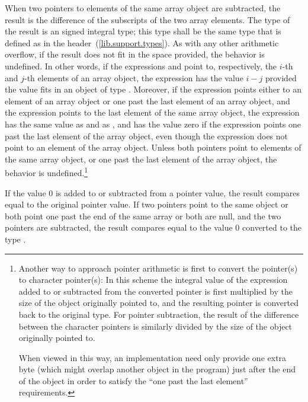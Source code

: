 \pnum
{}%
%
%
%
%
When two pointers to elements of the same array object are subtracted,
the result is the difference of the subscripts of the two array
elements. The type of the result is an  signed
integral type; this type shall be the same type that is defined as
 in the 
header~(\ref{lib.support.types}). As with any other arithmetic overflow, if
the result does not fit in the space provided, the behavior is
undefined. In other words, if the expressions  and 
point to, respectively, the $i$-th and $j$-th elements of an array
object, the expression  has the value $i-j$ provided the
value fits in an object of type . Moreover, if the
expression  points either to an element of an array object or
one past the last element of an array object, and the expression
 points to the last element of the same array object, the
expression  has the same value as 
and as , and has the value zero if the expression
 points one past the last element of the array object, even
though the expression  does not point to an element of the
array object. Unless both pointers point to elements of the same array
object, or one past the last element of the array object, the behavior
is undefined.\footnote{Another way to approach pointer arithmetic is first to convert the
pointer(s) to character pointer(s): In this scheme the integral value of
the expression added to or subtracted from the converted pointer is
first multiplied by the size of the object originally pointed to, and
the resulting pointer is converted back to the original type. For
pointer subtraction, the result of the difference between the character
pointers is similarly divided by the size of the object originally
pointed to.

When viewed in this way, an implementation need only provide one extra
byte (which might overlap another object in the program) just after the
end of the object in order to satisfy the ``one past the last element''
requirements.}

\pnum
If the value 0 is added to or subtracted from a pointer value, the
result compares equal to the original pointer value. If two pointers
point to the same object or both point one past the end of the same
array or both are null, and the two pointers are subtracted, the result
compares equal to the value 0 converted to the type
.

